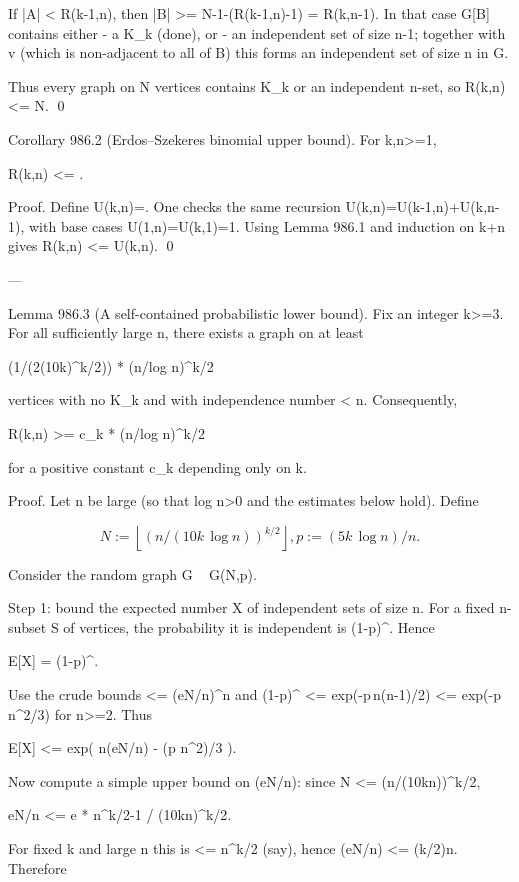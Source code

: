 If |A| < R(k-1,n), then |B| >= N-1-(R(k-1,n)-1) = R(k,n-1). In that case G[B] contains
either
- a K_k (done), or
- an independent set of size n-1; together with v (which is non-adjacent to all of B)
  this forms an independent set of size n in G.

Thus every graph on N vertices contains K_k or an independent n-set, so R(k,n) <= N.
\qed

Corollary 986.2 (Erdos--Szekeres binomial upper bound).
For k,n>=1,

  R(k,n) <= .

Proof.
Define U(k,n)=. One checks the same recursion
U(k,n)=U(k-1,n)+U(k,n-1), with base cases U(1,n)=U(k,1)=1.
Using Lemma 986.1 and induction on k+n gives R(k,n) <= U(k,n).
\qed

---

Lemma 986.3 (A self-contained probabilistic lower bound).
Fix an integer k>=3. For all sufficiently large n, there exists a graph on at least

  (1/(2(10k)^{k/2})) * (n/log n)^{k/2}

vertices with no K_k and with independence number < n. Consequently,

  R(k,n) >= c_k * (n/log n)^{k/2}

for a positive constant c_k depending only on k.

Proof.
Let n be large (so that log n>0 and the estimates below hold). Define

\[
  N := \left\lfloor (n/(10k\,\log n))^{k/2} \right\rfloor,
  p := (5k\,\log n)/n.
\]

Consider the random graph G ~ G(N,p).

Step 1: bound the expected number X of independent sets of size n.
For a fixed n-subset S of vertices, the probability it is independent is (1-p)^{}.
Hence

  E[X] =  (1-p)^{}.

Use the crude bounds  <= (eN/n)^n and (1-p)^{} <=
exp(-p\,n(n-1)/2) <= exp(-p\,n^2/3) for n>=2. Thus

  E[X] <= exp( n\log(eN/n) - (p n^2)/3 ).

Now compute a simple upper bound on \log(eN/n): since N <= (n/(10k\log n))^{k/2},

  eN/n <= e * n^{k/2-1} / (10k\log n)^{k/2}.

For fixed k and large n this is <= n^{k/2} (say), hence \log(eN/n) <= (k/2)\log n.
Therefore

